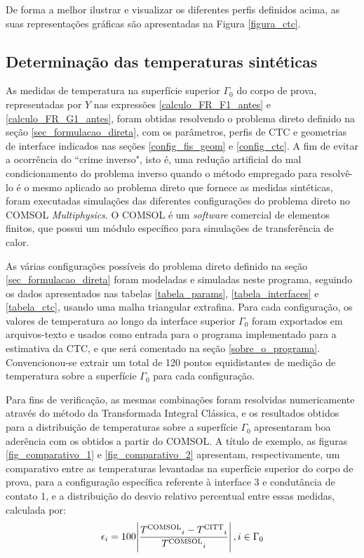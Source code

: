 De forma a melhor ilustrar e visualizar os diferentes perfis definidos acima, as suas representações gráficas são apresentadas na Figura \ref{figura_ctc}.



\subsection{Determinação das temperaturas sintéticas}

As medidas de temperatura na superfície superior $\Gamma_0$ do corpo de prova, representadas por $Y$ nas expressões \eqref{calculo_FR_F1_antes} e \eqref{calculo_FR_G1_antes}, foram obtidas resolvendo o problema direto definido na seção \ref{sec_formulacao_direta}, com os parâmetros, perfis de CTC e geometrias de interface indicados nas seções \ref{config_fis_geom} e \ref{config_ctc}. A fim de evitar a ocorrência do ``crime inverso", isto é, uma redução artificial do mal condicionamento do problema inverso quando o método empregado para resolvê-lo é o mesmo aplicado ao problema direto que fornece as medidas sintéticas\citep{livro_kaipio}, foram executadas simulações das diferentes configurações do problema direto no COMSOL \textit{Multiphysics}\textsuperscript{\textregistered}. O COMSOL é um \textit{software} comercial de elementos finitos, que possui um módulo específico para simulações de transferência de calor.

As várias configurações possíveis do problema direto definido na seção \ref{sec_formulacao_direta} foram modeladas e simuladas neste programa, seguindo os dados apresentados nas tabelas \ref{tabela_params}, \ref{tabela_interfaces} e \ref{tabela_ctc}, usando uma malha triangular extrafina. Para cada configuração, os valores de temperatura ao longo da interface superior $\Gamma_0$ foram exportados em arquivos-texto e usados como entrada para o programa implementado para a estimativa da CTC, e que será comentado na seção \ref{sobre_o_programa}. Convencionou-se extrair um total de 120 pontos equidistantes de medição de temperatura sobre a superfície $\Gamma_0$ para cada configuração.

Para fins de verificação, as mesmas combinações foram resolvidas numericamente através do método da Transformada Integral Clássica, e os resultados obtidos para a distribuição de temperaturas sobre a superfície $\Gamma_0$ apresentaram boa aderência com os obtidos a partir do COMSOL. A título de exemplo, as figuras \ref{fig_comparativo_1} e \ref{fig_comparativo_2} apresentam, respectivamente, um comparativo entre as temperaturas levantadas na superfície superior do corpo de prova, para a configuração específica referente à interface 3 e condutância de contato 1, e a distribuição do desvio relativo percentual entre essas medidas, calculada por:
\begin{align}
\epsilon_i = 100\abs{\frac{T\textsuperscript{COMSOL}_i - T\textsuperscript{CITT}_i}{T\textsuperscript{COMSOL}_i}}, i \in \Gamma_0
\end{align}

